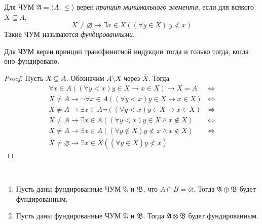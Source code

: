 \documentclass[12pt,a4paper]{article}
\begin{document}
    \begin{definition}
        Для ЧУМ $\mathfrak{A} = \langle A, {\leqslant} \rangle$ верен \emph{принцип минимального элемента}, если для всякого $X \subseteq A$,
        \[X \neq \varnothing \rightarrow \exists x \in X ((\forall y \in X )\ y \nless x)\]
        Такие ЧУМ называются \emph{фундированными}.
    \end{definition}

    \begin{theorem}
        Для ЧУМ верен принцип трансфинитной индукции тогда и только тогда, когда оно фундировано.
    \end{theorem}

    \begin{proof}
        Пусть $X \subseteq A$. Обозначим $A \setminus X$ через $\overline{X}$. Тогда
        \begin{align*}
            \forall x \in A ((\forall y < x) y \in X \rightarrow x \in X) \rightarrow X = A &\Longleftrightarrow\\
            X \neq A \rightarrow \neg\forall x \in A ((\forall y < x) y \in X \rightarrow x \in X) &\Longleftrightarrow\\
            X \neq A \rightarrow \exists x \in A \neg((\forall y < x) y \in X \rightarrow x \in X) &\Longleftrightarrow\\
            X \neq A \rightarrow \exists x \in A ((\forall y < x) y \in X \wedge x \notin X) &\Longleftrightarrow\\
            X \neq A \rightarrow \exists x \in A ((\forall y \notin X) y \nless x \wedge x \notin X) &\Longleftrightarrow\\
            \overline{X} \neq \varnothing \rightarrow \exists x \in \overline{X} ((\forall y \in \overline{X}) y \nless x)&
        \end{align*}
    \end{proof}

    \begin{statement}\ 
        \begin{enumerate}
            \item Пусть даны фундированные ЧУМ $\mathfrak{A}$ и $\mathfrak{B}$, что $A \cap B = \varnothing$. Тогда $\mathfrak{A} \oplus \mathfrak{B}$ будет фундированным.
            \item Пусть даны фундированные ЧУМ $\mathfrak{A}$ и $\mathfrak{B}$. Тогда $\mathfrak{A} \otimes \mathfrak{B}$ будет фундированным.
        \end{enumerate}
    \end{statement}
\end{document}
